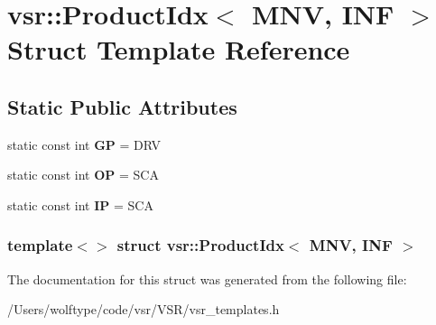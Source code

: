 \hypertarget{structvsr_1_1_product_idx_3_01_m_n_v_00_01_i_n_f_01_4}{\section{vsr\-:\-:Product\-Idx$<$ M\-N\-V, I\-N\-F $>$ Struct Template Reference}
\label{structvsr_1_1_product_idx_3_01_m_n_v_00_01_i_n_f_01_4}
}
\subsection*{Static Public Attributes}
\begin{DoxyCompactItemize}
\item 
\hypertarget{structvsr_1_1_product_idx_3_01_m_n_v_00_01_i_n_f_01_4_a7140ed0ff0e5fa3f32b1b6cbf50f7065}{static const int {\bfseries G\-P} = D\-R\-V}\label{structvsr_1_1_product_idx_3_01_m_n_v_00_01_i_n_f_01_4_a7140ed0ff0e5fa3f32b1b6cbf50f7065}

\item 
\hypertarget{structvsr_1_1_product_idx_3_01_m_n_v_00_01_i_n_f_01_4_a570f7a08ac6647b09507ddb738a69d1c}{static const int {\bfseries O\-P} = S\-C\-A}\label{structvsr_1_1_product_idx_3_01_m_n_v_00_01_i_n_f_01_4_a570f7a08ac6647b09507ddb738a69d1c}

\item 
\hypertarget{structvsr_1_1_product_idx_3_01_m_n_v_00_01_i_n_f_01_4_a2fccbf9c202d53daa640ab725b87f000}{static const int {\bfseries I\-P} = S\-C\-A}\label{structvsr_1_1_product_idx_3_01_m_n_v_00_01_i_n_f_01_4_a2fccbf9c202d53daa640ab725b87f000}

\end{DoxyCompactItemize}
\subsubsection*{template$<$$>$ struct vsr\-::\-Product\-Idx$<$ M\-N\-V, I\-N\-F $>$}



The documentation for this struct was generated from the following file\-:\begin{DoxyCompactItemize}
\item 
/\-Users/wolftype/code/vsr/\-V\-S\-R/vsr\-\_\-templates.\-h\end{DoxyCompactItemize}
